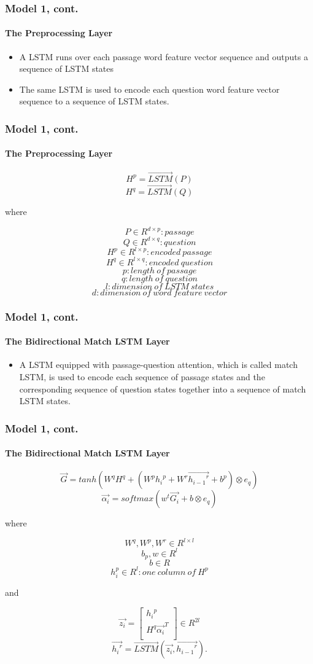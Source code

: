\documentclass{beamer}
\begin{document}
\begin{frame} \frametitle{Model 1, cont.}\framesubtitle{The Preprocessing Layer}

    \begin{itemize}
        \item A LSTM runs over each passage word feature vector sequence and outputs a sequence of LSTM states
        \item The same LSTM is used to encode each question word feature vector sequence to a sequence of LSTM states.
    \end{itemize}
\end{frame}

\begin{frame} \frametitle{Model 1, cont.}\framesubtitle{The Preprocessing Layer}
    $$H^p = \overrightarrow{LSTM}(P)$$
    $$H^q = \overrightarrow{LSTM}(Q)$$

    where

    $$P\in R^{d \times p}: passage$$
    $$Q\in R^{d \times q}: question$$
    $$H^p\in R^{l \times p}: encoded\ passage$$
    $$H^q\in R^{l \times q}: encoded\ question$$
    $$p: length \ of\ passage$$
    $$q: length\ of\ question$$
    $$l: dimension\ of\ LSTM\ states$$
    $$d: dimension\ of\ word\ feature\ vector$$

\end{frame}

\begin{frame} \frametitle{Model 1, cont.}\framesubtitle{The Bidirectional Match LSTM Layer}
    \begin{itemize}
        \item A LSTM equipped with passage-question attention, which is called match LSTM, is used to encode each sequence of passage states and the corresponding sequence of question states together into a sequence of match LSTM states.
    \end{itemize}
\end{frame}

\begin{frame} \frametitle{Model 1, cont.}\framesubtitle{The Bidirectional Match LSTM Layer}

    $$\overrightarrow{G} = tanh(W^qH^q + (W^p{h_i}^p + W^r\overrightarrow{{h_{i-1}}^r} + b^p) \otimes e_q)$$
    $$\overrightarrow{\alpha _i} = softmax(w^t\overrightarrow{G_i} + b \otimes e_q)$$


    where

    $$W^q, W^p, W^r\in R^{l \times l} $$
    $$b_p, w\in R^{l}  $$
    $$b \in R $$
    $${h_{i}^p}\in R^{l}: one\ column\ of\ H^p  $$

    and

    \[ \overrightarrow{z_i} =
    \begin{bmatrix}
    {h_i}^p \\
    H^q\overrightarrow{ {\alpha _i}}^T \\
    \end{bmatrix}
    \in R^{2l}
    \]
    $$\overrightarrow{{h_i}^r} = \overrightarrow{LSTM}(\overrightarrow{z_i}, \overrightarrow{{h_{i-1}}^r}).$$

\end{frame}
\end{document}
